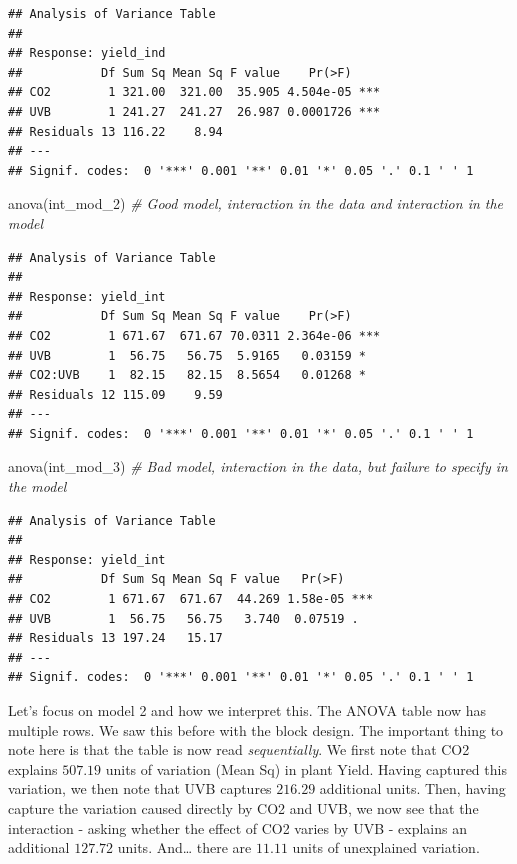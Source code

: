 \documentclass[
]{book}
\newenvironment{Shaded}{\begin{snugshade}}{\end{snugshade}}
\newcommand{\CommentTok}[1]{\textcolor[rgb]{0.56,0.35,0.01}{\textit{#1}}}
\newcommand{\FunctionTok}[1]{\textcolor[rgb]{0.00,0.00,0.00}{#1}}
\newcommand{\NormalTok}[1]{#1}
\begin{document}
\begin{verbatim}
## Analysis of Variance Table
## 
## Response: yield_ind
##           Df Sum Sq Mean Sq F value    Pr(>F)    
## CO2        1 321.00  321.00  35.905 4.504e-05 ***
## UVB        1 241.27  241.27  26.987 0.0001726 ***
## Residuals 13 116.22    8.94                      
## ---
## Signif. codes:  0 '***' 0.001 '**' 0.01 '*' 0.05 '.' 0.1 ' ' 1
\end{verbatim}

\begin{Shaded}
\begin{Highlighting}[]
\FunctionTok{anova}\NormalTok{(int\_mod\_2) }\CommentTok{\# Good model, interaction in the data and interaction in the model}
\end{Highlighting}
\end{Shaded}

\begin{verbatim}
## Analysis of Variance Table
## 
## Response: yield_int
##           Df Sum Sq Mean Sq F value    Pr(>F)    
## CO2        1 671.67  671.67 70.0311 2.364e-06 ***
## UVB        1  56.75   56.75  5.9165   0.03159 *  
## CO2:UVB    1  82.15   82.15  8.5654   0.01268 *  
## Residuals 12 115.09    9.59                      
## ---
## Signif. codes:  0 '***' 0.001 '**' 0.01 '*' 0.05 '.' 0.1 ' ' 1
\end{verbatim}

\begin{Shaded}
\begin{Highlighting}[]
\FunctionTok{anova}\NormalTok{(int\_mod\_3) }\CommentTok{\# Bad model, interaction in the data, but failure to specify in the model}
\end{Highlighting}
\end{Shaded}

\begin{verbatim}
## Analysis of Variance Table
## 
## Response: yield_int
##           Df Sum Sq Mean Sq F value   Pr(>F)    
## CO2        1 671.67  671.67  44.269 1.58e-05 ***
## UVB        1  56.75   56.75   3.740  0.07519 .  
## Residuals 13 197.24   15.17                     
## ---
## Signif. codes:  0 '***' 0.001 '**' 0.01 '*' 0.05 '.' 0.1 ' ' 1
\end{verbatim}

Let's focus on model 2 and how we interpret this. The ANOVA table now has multiple rows. We saw this before with the block design. The important thing to note here is that the table is now read \emph{sequentially}. We first note that CO2 explains \(507.19\) units of variation (Mean Sq) in plant Yield. Having captured this variation, we then note that UVB captures \(216.29\) additional units. Then, having capture the variation caused directly by CO2 and UVB, we now see that the interaction - asking whether the effect of CO2 varies by UVB - explains an additional \(127.72\) units. And\ldots{} there are \(11.11\) units of unexplained variation.
\end{document}
